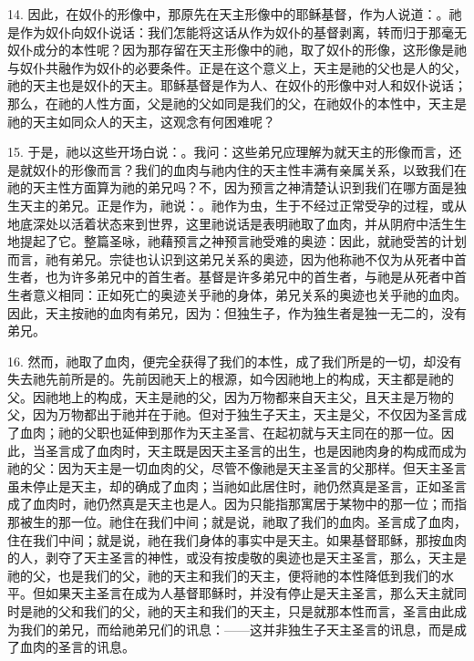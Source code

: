 14. 因此，在奴仆的形像中，那原先在天主形像中的耶稣基督，作为人说道：。祂是作为奴仆向奴仆说话：我们怎能将这话从作为奴仆的基督剥离，转而归于那毫无奴仆成分的本性呢？因为那存留在天主形像中的祂，取了奴仆的形像，这形像是祂与奴仆共融作为奴仆的必要条件。正是在这个意义上，天主是祂的父也是人的父，祂的天主也是奴仆的天主。耶稣基督是作为人、在奴仆的形像中对人和奴仆说话；那么，在祂的人性方面，父是祂的父如同是我们的父，在祂奴仆的本性中，天主是祂的天主如同众人的天主，这观念有何困难呢？\par

15. 于是，祂以这些开场白说：。我问：这些弟兄应理解为就天主的形像而言，还是就奴仆的形像而言？我们的血肉与祂内住的天主性丰满有亲属关系，以致我们在祂的天主性方面算为祂的弟兄吗？不，因为预言之神清楚认识到我们在哪方面是独生天主的弟兄。正是作为，祂说：。祂作为虫，生于不经过正常受孕的过程，或从地底深处以活着状态来到世界，这里祂说话是表明祂取了血肉，并从阴府中活生生地提起了它。整篇圣咏，祂藉预言之神预言祂受难的奥迹：因此，就祂受苦的计划而言，祂有弟兄。宗徒也认识到这弟兄关系的奥迹，因为他称祂不仅为从死者中首生者，也为许多弟兄中的首生者。基督是许多弟兄中的首生者，与祂是从死者中首生者意义相同：正如死亡的奥迹关乎祂的身体，弟兄关系的奥迹也关乎祂的血肉。因此，天主按祂的血肉有弟兄，因为：但独生子，作为独生者是独一无二的，没有弟兄。\par

16. 然而，祂取了血肉，便完全获得了我们的本性，成了我们所是的一切，却没有失去祂先前所是的。先前因祂天上的根源，如今因祂地上的构成，天主都是祂的父。因祂地上的构成，天主是祂的父，因为万物都来自天主父，且天主是万物的父，因为万物都出于祂并在于祂。但对于独生子天主，天主是父，不仅因为圣言成了血肉；祂的父职也延伸到那作为天主圣言、在起初就与天主同在的那一位。因此，当圣言成了血肉时，天主既是因天主圣言的出生，也是因祂肉身的构成而成为祂的父：因为天主是一切血肉的父，尽管不像祂是天主圣言的父那样。但天主圣言虽未停止是天主，却的确成了血肉；当祂如此居住时，祂仍然真是圣言，正如圣言成了血肉时，祂仍然真是天主也是人。因为只能指那寓居于某物中的那一位；而指那被生的那一位。祂住在我们中间；就是说，祂取了我们的血肉。圣言成了血肉，住在我们中间；就是说，祂在我们身体的事实中是天主。如果基督耶稣，那按血肉的人，剥夺了天主圣言的神性，或没有按虔敬的奥迹也是天主圣言，那么，天主是祂的父，也是我们的父，祂的天主和我们的天主，便将祂的本性降低到我们的水平。但如果天主圣言在成为人基督耶稣时，并没有停止是天主圣言，那么天主就同时是祂的父和我们的父，祂的天主和我们的天主，只是就那本性而言，圣言由此成为我们的弟兄，而给祂弟兄们的讯息：——这并非独生子天主圣言的讯息，而是成了血肉的圣言的讯息。\par


